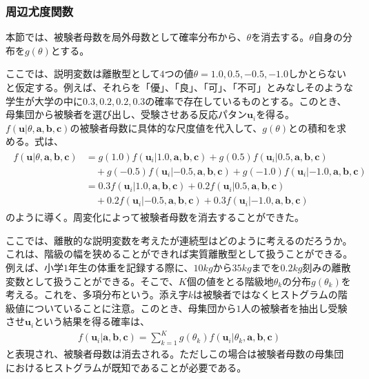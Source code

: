 \documentclass[12pt]{jarticle}
\begin{document}
\subsubsection{周辺尤度関数}
本節では、被験者母数を局外母数として確率分布から、$\displaystyle\theta$を消去する。$\displaystyle\theta$自身の分布を$\displaystyle g(\theta)$とする。

ここでは、説明変数は離散型として$4$つの値$\displaystyle \theta = 1.0,0.5,-0.5,-1.0$しかとらないと仮定する。例えば、それらを「優」、「良」、「可」、「不可」とみなしそのような学生が大学の中に$0.3,0.2,0.2,0.3$の確率で存在しているものとする。このとき、母集団から被験者を選び出し、受験させある反応パタン$\boldsymbol{u}_i$を得る。$f(\boldsymbol{u}|\theta,
\boldsymbol{a,b,c})$の被験者母数に具体的な尺度値を代入して、$g(\theta)$との積和を求める。式は、
\begin{align}
  \begin{split}
  \label{03}
  \displaystyle f(\boldsymbol{u}|\theta,\boldsymbol{a,b,c}) &= g(1.0)f(\boldsymbol{u}_i|1.0,\boldsymbol{a,b,c}) + g(0.5)f(\boldsymbol{u}_i|0.5,\boldsymbol{a,b,c})\\&\quad + g(-0.5)f(\boldsymbol{u}_i|-0.5,\boldsymbol{a,b,c}) + g(-1.0)f(\boldsymbol{u}_i|-1.0,\boldsymbol{a,b,c})\\ &= 0.3f(\boldsymbol{u}_i|1.0,\boldsymbol{a,b,c}) + 0.2f(\boldsymbol{u}_i|0.5,\boldsymbol{a,b,c})\\&\quad + 0.2f(\boldsymbol{u}_i|-0.5,\boldsymbol{a,b,c}) + 0.3f(\boldsymbol{u}_i|-1.0,\boldsymbol{a,b,c})
  \end{split}
\end{align}
のように導く。周変化によって被験者母数を消去することができた。

ここでは、離散的な説明変数を考えたが連続型はどのように考えるのだろうか。これは、階級の幅を狭めることができれば実質離散型として扱うことができる。例えば、小学$1$年生の体重を記録する際に、$10kg$から$35kg$までを$0.2kg$刻みの離散変数として扱うことができる。そこで、$K$個の値をとる階級地$\displaystyle \theta_k$の分布$\displaystyle g(\theta_k)$を考える。これを、多項分布という。添え字$k$は被験者ではなくヒストグラムの階級値についていることに注意。このとき、母集団から$1$人の被験者を抽出し受験させ$\displaystyle \boldsymbol{u}_i$という結果を得る確率は、
\begin{align}
  \label{04}
  \displaystyle  f(\boldsymbol{u}_i|\boldsymbol{a,b,c}) = \sum_{k = 1}^{K} g(\theta_k)f(\boldsymbol{u}_i|\theta_k,\boldsymbol{a,b,c}) \tag{4.20}
\end{align}
と表現され、被験者母数は消去される。ただしこの場合は被験者母数の母集団におけるヒストグラムが既知であることが必要である。
\end{document}
